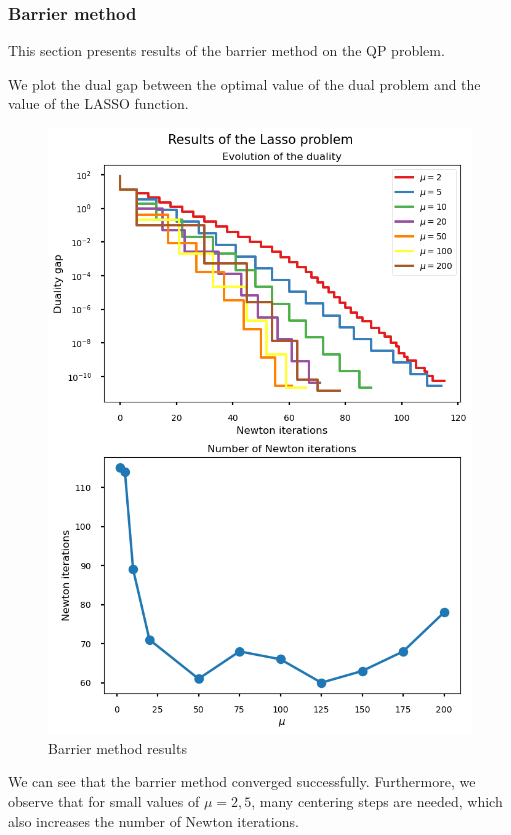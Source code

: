 \documentclass[11pt]{article}
\begin{document}
    \hypertarget{barrier-method}{%
\subsubsection{Barrier method}\label{barrier-method}}

This section presents results of the barrier method on the QP problem.

We plot the dual gap between the optimal value of the dual problem and
the value of the LASSO function.

\begin{figure}
\centering
\includegraphics{outputs/lasso_pb_outputs_10.png}
\caption{Barrier method results}
\end{figure}

We can see that the barrier method converged successfully. Furthermore,
we observe that for small values of \(\mu=2, 5\), many centering steps
are needed, which also increases the number of Newton iterations.
\end{document}
